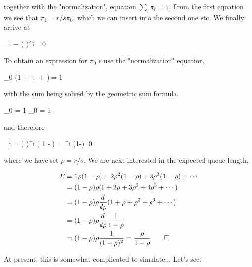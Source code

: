 together with the "normalization", equation $\sum_i \pi_i = 1$. From the first equation we see that $\pi_1 = r/s \pi_0$, which we can insert into the second one etc. We finally arrive at

\bee
\pi_i = \left(  \right)^i \pi_0
\eee

To obtain an expression for $\pi_0$ e use the "normalization" equation,

\bee
\pi_0 \left(1 +  +  + \cdots \right) = 1
\eee

with the sum being solved by the geometric sum formula,

\bee
\pi_0  = 1 \rightarrow \pi_0 = 1 - 
\eee

and therefore

\bee
\pi_i = \left(  \right)^i \left( 1 -  \right) = \rho^i (1-\rho) \qed
\eee

where we have set $\rho = r/s$. We are next interested in the expected queue length,

\begin{align*}
E &= 1 \rho(1-\rho) + 2 \rho^2(1-\rho)+  3 \rho^3(1-\rho) + \cdots \\
  &= (1-\rho) \rho (1+2\rho + 3 \rho^2 + 4 \rho^3 + \cdots) \\
  &= (1-\rho) \rho \frac{d}{d\rho} (1 + \rho + \rho^2 + \rho^3 + \cdots) \\
  &= (1-\rho) \rho \frac{d}{d\rho} \frac{1}{1 - \rho} \\
  &= (1-\rho) \rho \frac{1}{(1-\rho)^2} = \frac{\rho}{1 - \rho} \qed
\end{align*}

At present, this is somewhat complicated to simulate... Let's see.


